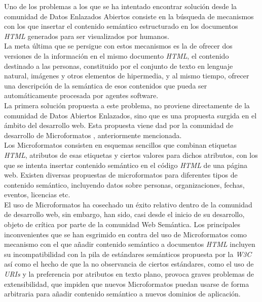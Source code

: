 Uno de los problemas a los que se ha intentado encontrar soluci\'on desde la comunidad de Datos Enlazados Abiertos consiste en la b\'usqueda de mecanismos con los que insertar el contenido sem\'antico estructurado en los documentos \textit{HTML} generados para ser visualizados por humanos.\\
La meta \'ultima que se persigue con estos mecanismos es la de ofrecer dos versiones de la informaci\'on en el mismo documento \textit{HTML}, el contenido destinado a las personas, constituido por el conjunto de texto en lenguaje natural, im\'agenes y otros elementos de hipermedia, y al mismo tiempo, ofrecer una descripci\'on de la sem\'antica de esos contenidos que pueda ser autom\'aticamente procesada por agentes software.\\
La primera soluci\'on propuesta a este problema, no proviene directamente de la comunidad de Datos Abiertos Enlazados, sino que es una propuesta surgida en el \'ambito del desarrollo web. Esta propuesta viene dad por la comunidad de desarrollo de Microformatos \cite{microformats}, anteriormente mencionada.\\
Los Microformatos consisten en esquemas sencillos que combinan etiquetas \textit{HTML}, atributos de esas etiquetas y ciertos valores para dichos atributos, con los que se intenta insertar contenido sem\'antico en el c\'odigo \textit{HTML} de una p\'agina web. Existen diversas propuestas de microformatos para diferentes tipos de contenido sem\'antico, incluyendo datos sobre personas, organizaciones, fechas, eventos, licencias etc.\\
El uso de Microformatos ha cosechado un \'exito relativo dentro de la comunidad de desarrollo web, sin embargo, han sido, casi desde el inicio de su desarrollo, objeto de cr\'itica por parte de la comunidad Web Sem\'antica. Los principales inconvenientes que se han esgrimido en contra del uso de Microformatos \cite{graf2007rdfa} como mecanismo con el que a\~nadir contenido sem\'antico a documentos \textit{HTML} incluyen su incompatibilidad con la pila de est\'andares sem\'anticos propuesta por la \textit{W3C} as\'i como el hecho de que la no observancia de ciertos est\'andares, como el uso de \textit{URIs} y la preferencia por atributos en texto plano, provoca graves problemas de extensibilidad, que impiden que nuevos Microformatos puedan usarse de forma arbitraria para a\~nadir contenido sem\'antico a nuevos dominios de aplicaci\'on.\\
